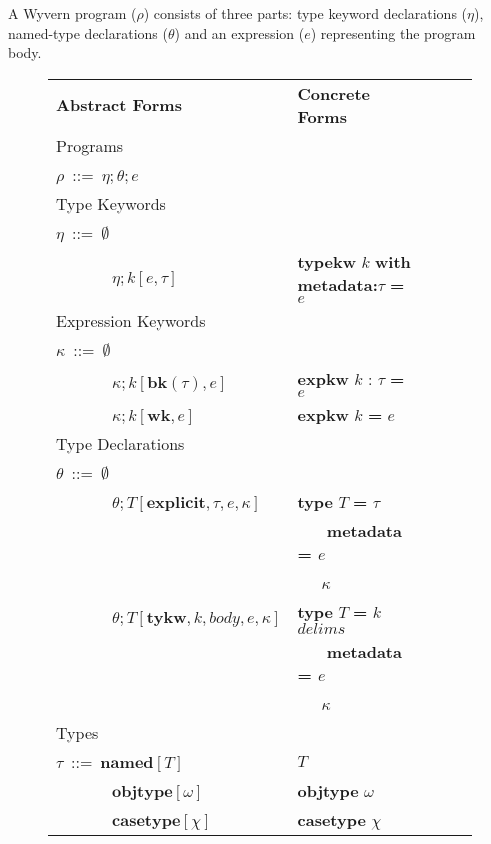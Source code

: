 \documentclass{sig-alternate}
\makeatletter
\newcommand\BeraMonottfamily{%
  \def\fvm@Scale{0.85}%
  \fontfamily{fvm}\selectfont%
}
\newcommand{\textcd}[1]{\textbf{\scriptsize\BeraMonottfamily{#1}}}
\newcommand{\tabularspace}{~~~~~~~}
\makeatother
\begin{document}
A Wyvern program ($\rho$) consists of three parts: type keyword declarations ($\eta$), named-type declarations ($\theta$) and an expression ($e$) representing the program body.


\begin{figure}[ht]
\hspace{-5px}\begin{tabular}{ l l l l l }
 \multicolumn{1}{l}{\textbf{Abstract Forms}} & \multicolumn{1}{l}{\textbf{Concrete Forms}}\\
 \multicolumn{3}{l}{Programs}\\
$\rho$~::=~$\eta;\theta;e$\\
\multicolumn{3}{l}{Type Keywords}\\
$\eta$~::=~$\emptyset$\\
\tabularspace$\eta;k[e,\tau]$ & \textcd{typekw} $k$ \textcd{with metadata:}$\tau$ \textcd{=} $e$ \\
\multicolumn{3}{l}{Expression Keywords}\\
$\kappa$~::=~$\emptyset$                        & \\
\tabularspace$\kappa;k[\mathbf{bk}(\tau),e]$    & \textcd{expkw} $k$ : $\tau$ \textcd{=} $e$\\
\tabularspace$\kappa;k[\mathbf{wk},e]$          & \textcd{expkw} $k$ \textcd{=} $e$\\
\multicolumn{3}{l}{Type Declarations}\\
$\theta$~::=~$\emptyset$                        & \\
\tabularspace$\theta; T[\mathbf{explicit},\tau, e, \kappa]$  & \textcd{type} $T$ \textcd{=} $\tau$\\
&~~~\textcd{metadata = }$e$\\
&~~~$\kappa$\\
\tabularspace$\theta; T[\mathbf{tykw},k, body, e, \kappa]$   & \textcd{type} $T$ \textcd{=} $k$ $delims$\\
                                                          & ~~~\textcd{metadata = }$e$\\
                                                          & ~~~$\kappa$\\
\multicolumn{3}{l}{Types}\\
$\tau$~::=~$\mathbf{named}[T]$              & $T$\\
\tabularspace$\mathbf{objtype}[\omega]$       & \textcd{objtype} $\omega$ \\
\tabularspace$\mathbf{casetype}[\chi]$        & \textcd{casetype} $\chi$\\

\end{tabular}
\end{figure}
\end{document}
